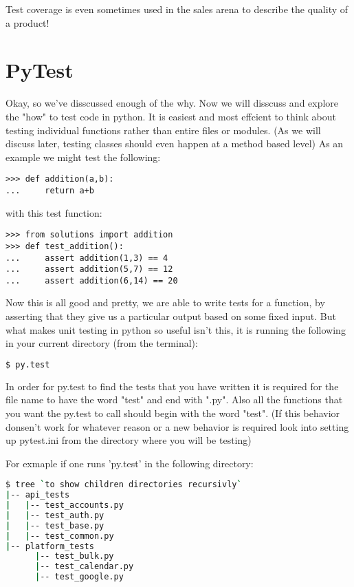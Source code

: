 Test coverage is even sometimes used in the sales arena to describe the quality of a product!

\section*{PyTest}

Okay, so we've disscussed enough of the why. Now we will disscuss and explore the "how" to test code in python.
It is easiest and most effcient to think about testing individual functions rather than entire files or modules.
(As we will discuss later, testing classes should even happen at a method based level)
As an example we might test the following:
\begin{lstlisting}
>>> def addition(a,b):
...     return a+b
\end{lstlisting}
with this test function:
\begin{lstlisting}
>>> from solutions import addition
>>> def test_addition():
...     assert addition(1,3) == 4
...     assert addition(5,7) == 12
...     assert addition(6,14) == 20
\end{lstlisting}

Now this is all good and pretty, we are able to write tests for a function, by asserting that they give us a particular output based on some fixed input.
But what makes unit testing in python so useful isn't this, it is running the following in your current directory (from the terminal):
\begin{lstlisting}[language=bash]
  $ py.test
\end{lstlisting}

\begin{info}
In order for py.test to find the tests that you have written it is required for the file name to have the word "test" and end with ".py".
Also all the functions that you want the py.test to call should begin with the word "test".
(If this behavior donsen't work for whatever reason or a new behavior is required look into setting up pytest.ini from the directory where you will be testing)\\
\end{info}

For exmaple if one runs 'py.test' in the following directory:
\begin{lstlisting}[language=bash]
$ tree `to show children directories recursivly`
|-- api_tests
|   |-- test_accounts.py
|   |-- test_auth.py
|   |-- test_base.py
|   |-- test_common.py
|-- platform_tests
      |-- test_bulk.py
      |-- test_calendar.py
      |-- test_google.py
\end{lstlisting}

